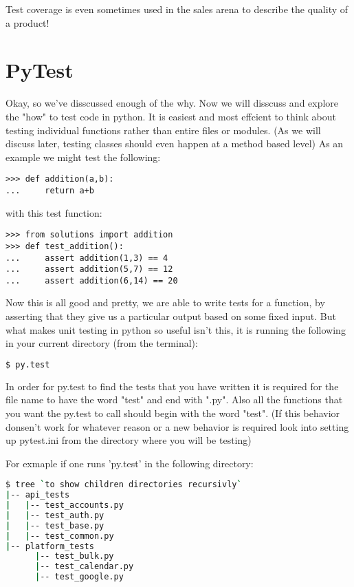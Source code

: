 Test coverage is even sometimes used in the sales arena to describe the quality of a product!

\section*{PyTest}

Okay, so we've disscussed enough of the why. Now we will disscuss and explore the "how" to test code in python.
It is easiest and most effcient to think about testing individual functions rather than entire files or modules.
(As we will discuss later, testing classes should even happen at a method based level)
As an example we might test the following:
\begin{lstlisting}
>>> def addition(a,b):
...     return a+b
\end{lstlisting}
with this test function:
\begin{lstlisting}
>>> from solutions import addition
>>> def test_addition():
...     assert addition(1,3) == 4
...     assert addition(5,7) == 12
...     assert addition(6,14) == 20
\end{lstlisting}

Now this is all good and pretty, we are able to write tests for a function, by asserting that they give us a particular output based on some fixed input.
But what makes unit testing in python so useful isn't this, it is running the following in your current directory (from the terminal):
\begin{lstlisting}[language=bash]
  $ py.test
\end{lstlisting}

\begin{info}
In order for py.test to find the tests that you have written it is required for the file name to have the word "test" and end with ".py".
Also all the functions that you want the py.test to call should begin with the word "test".
(If this behavior donsen't work for whatever reason or a new behavior is required look into setting up pytest.ini from the directory where you will be testing)\\
\end{info}

For exmaple if one runs 'py.test' in the following directory:
\begin{lstlisting}[language=bash]
$ tree `to show children directories recursivly`
|-- api_tests
|   |-- test_accounts.py
|   |-- test_auth.py
|   |-- test_base.py
|   |-- test_common.py
|-- platform_tests
      |-- test_bulk.py
      |-- test_calendar.py
      |-- test_google.py
\end{lstlisting}

